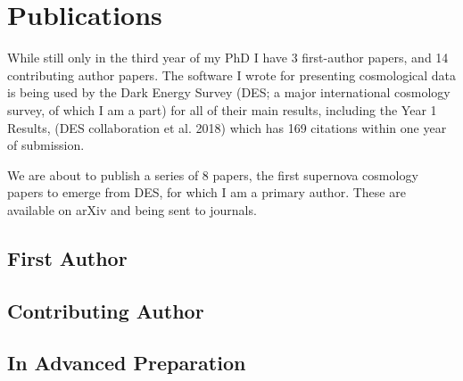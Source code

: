\documentclass[]{friggeri-cv} %
\begin{document}
\section{Publications}

While still only in the third year of my PhD I have 3 first-author papers, and 14 contributing author papers.  The software I wrote for presenting cosmological data is being used by the Dark Energy Survey (DES; a major international cosmology survey, of which I am a part) for all of their main results, including the Year 1 Results, (DES collaboration et al. 2018) which has 169 citations within one year of submission. 

We are about to publish a series of 8 papers, the first supernova cosmology papers to emerge from DES, for which I am a primary author.  These are available on arXiv and being sent to journals. \\


\subsection{First Author}

\newrefcontext[sorting=ydnt]
\begin{refsection}
    \nocite{*}
    \printbibliography[heading=none, keyword={primary}]
\end{refsection}


\subsection{Contributing Author}
\begin{refsection}
	\nocite{*}
	\printbibliography[heading=none, keyword={secondary}]
\end{refsection}


\subsection{In Advanced Preparation}
\begin{refsection}
	\nocite{*}
	\printbibliography[heading=none, keyword={draft}]
\end{refsection}


\end{document}
